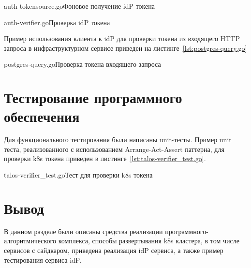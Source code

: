 	{auth-tokensource.go}{Фоновое получение idP токена}

	{auth-verifier.go}{Проверка idP токена}

Пример использования клиента к idP для проверки токена из входящего HTTP запроса в инфраструктурном сервисе приведен на листинге~\ref{lst:postgres-query.go}

	{postgres-query.go}{Проверка токена входящего запроса}

\section{Тестирование программного обеспечения}

Для функционального тестирования были написаны unit-тесты.
Пример unit теста, реализованного с использованием Arrange-Act-Assert паттерна, для проверки k8s токена приведен в листинге~\ref{lst:talos-verifier_test.go}.

	{talos-verifier_test.go}{Тест для проверки k8s токена}

\section*{Вывод}
В данном разделе были описаны средства реализации программного-алгоритмического комплекса, способы развертывания k8s кластера, в том числе сервисов с сайдкаром, приведена реализация idP сервиса, а также пример тестирования сервиса idP.

%	
%
%
